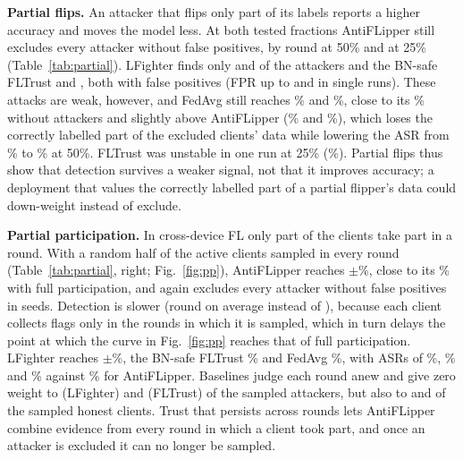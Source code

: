 \documentclass[journal]{IEEEtran}
\begin{document}
\textbf{Partial flips.} An attacker that flips only part of its labels reports a higher accuracy and moves the model less. At both tested fractions AntiFLipper still excludes every attacker without false positives, by round \pfDetHalf{} at 50\% and \pfDetQuarter{} at 25\% (Table~\ref{tab:partial}). LFighter finds only \pfRecLFighterHalf{} and \pfRecLFighterQuarter{} of the attackers and the BN-safe FLTrust \pfRecFLTrustHalf{} and \pfRecFLTrustQuarter, both with false positives (FPR up to \pfFPRLFighterMax{} and \pfFPRFLTrustMax{} in single runs). These attacks are weak, however, and FedAvg still reaches \pfAccFedAvgHalf\% and \pfAccFedAvgQuarter\%, close to its \fedCleanHigh\% without attackers and slightly above AntiFLipper (\pfAccHalf\% and \pfAccQuarter\%), which loses the correctly labelled part of the excluded clients' data while lowering the ASR from \pfASRFedAvgHalf\% to \pfASRHalf\% at 50\%. FLTrust was unstable in one run at 25\% (\pfAccFLTrustQuarterMin\%). Partial flips thus show that detection survives a weaker signal, not that it improves accuracy; a deployment that values the correctly labelled part of a partial flipper's data could down-weight instead of exclude.

\textbf{Partial participation.} In cross-device FL only part of the clients take part in a round. With a random half of the active clients sampled in every round (Table~\ref{tab:partial}, right; Fig.~\ref{fig:pp}), AntiFLipper reaches \ppAcc$\pm$\ppAccStd\%, close to its \headAcc\% with full participation, and again excludes every attacker without false positives in \ppFull{} seeds. Detection is slower (round \ppDet{} on average instead of \headDet), because each client collects flags only in the rounds in which it is sampled, which in turn delays the point at which the curve in Fig.~\ref{fig:pp} reaches that of full participation. LFighter reaches \ppAccLFighter$\pm$\ppAccLFighterStd\%, the BN-safe FLTrust \ppAccFLTrust\% and FedAvg \ppAccFedAvg\%, with ASRs of \ppASRLFighter\%, \ppASRFLTrust\% and \ppASRFedAvg\% against \ppASR\% for AntiFLipper. Baselines judge each round anew and give zero weight to \ppRecallLFighter{} (LFighter) and \ppRecallFLTrust{} (FLTrust) of the sampled attackers, but also to \ppFPRLFighter{} and \ppFPRFLTrust{} of the sampled honest clients. Trust that persists across rounds lets AntiFLipper combine evidence from every round in which a client took part, and once an attacker is excluded it can no longer be sampled.
\end{document}
